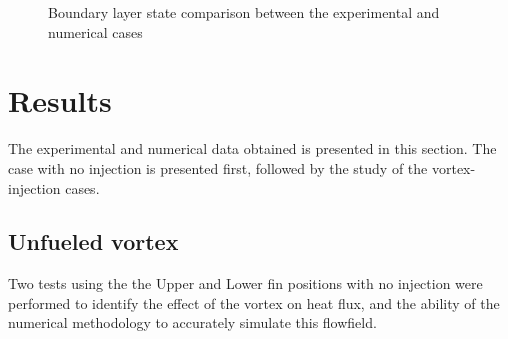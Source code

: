 \documentclass{AIAA}
\begin{document}
\begin{figure}[!h]
\center
{}
\caption{Boundary layer state comparison between the experimental and numerical cases}
\label{fig:Num_Exp_BLcompar}
\end{figure} 



\section{Results}

The experimental and numerical data obtained is presented in this section. The case with no injection is presented first, followed by the study of the vortex-injection cases.

\subsection{Unfueled vortex}

Two tests using the the Upper and Lower fin positions with no injection were performed to identify the effect of the vortex on heat flux, and the ability of the numerical methodology to accurately simulate this flowfield.
\end{document}
